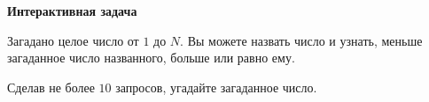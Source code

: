 \textbf{Интерактивная задача}

Загадано целое число от $1$ до $N$. Вы можете назвать число и узнать, меньше загаданное число названного, больше или равно ему.

Сделав не более $10$ запросов, угадайте загаданное число.
